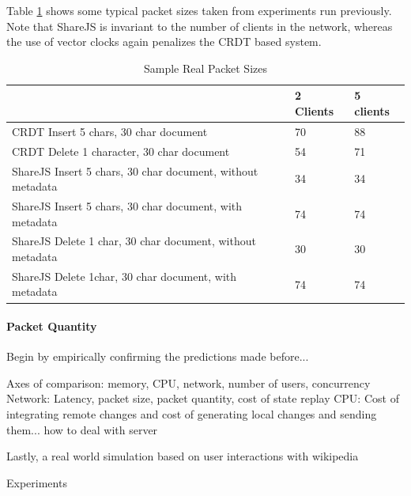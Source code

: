 \documentclass[12pt,a4paper,twoside,openright]{report}
\begin{document}
			Table \ref{tab:samplepacketsizes} shows some typical packet sizes taken from experiments run previously. Note that ShareJS is invariant to the number of clients in the network, whereas the use of vector clocks again penalizes the CRDT based system.
			
			\begin{table}[htb]
			\centering
			\caption[Sample Packet Sizes]{Sample Real Packet Sizes}
			\label{tab:samplepacketsizes}
			\begin{tabular}{@{}lll@{}}
			                                                           & 2 Clients & 5 clients \\ \toprule
			CRDT Insert 5 chars, 30 char document                      & 70        & 88        \\ \midrule
			CRDT Delete 1 character, 30 char document                  & 54        & 71        \\ \midrule
			ShareJS Insert 5 chars, 30 char document, without metadata & 34        & 34        \\ \midrule
			ShareJS Insert 5 chars, 30 char document, with metadata    & 74        & 74        \\ \midrule
			ShareJS Delete 1 char, 30 char document, without metadata  & 30        & 30        \\
			ShareJS Delete 1char, 30 char document, with metadata      & 74        & 74       \bottomrule
			\end{tabular}
			\end{table}
			
			
			
		\paragraph{Packet Quantity}
			
	
	
	
	
		Begin by empirically confirming the predictions made before... 
		
		Axes of comparison: memory, CPU, network, number of users, concurrency
			Network: Latency, packet size, packet quantity, cost of state replay
			CPU: Cost of integrating remote changes and cost of generating local changes and sending them... how to deal with server
			
		
		
		Lastly, a real world simulation based on user interactions with wikipedia
		
		
		Experiments
\end{document}
